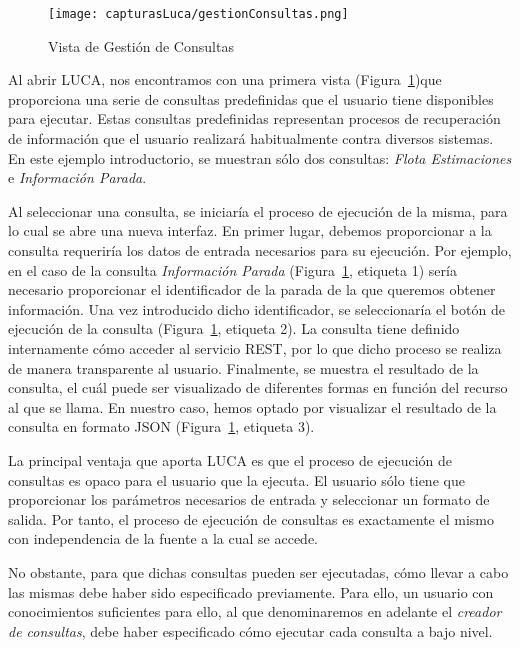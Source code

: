 \begin{figure}[!tb]
    \centering
 	\texttt{[image: capturasLuca/gestionConsultas.png]}
	\caption{Vista de Gestión de Consultas}
    \label{fig:gestionConsulta}
\end{figure}

Al abrir LUCA, nos encontramos con una primera vista (Figura~\ref{fig:gestionConsulta})que proporciona una serie de consultas predefinidas que el usuario tiene disponibles para ejecutar. Estas consultas predefinidas representan procesos de recuperación de información que el usuario realizará habitualmente contra diversos sistemas. En este ejemplo introductorio, se muestran sólo dos consultas: \emph{Flota Estimaciones} e \emph{Información Parada}.


Al seleccionar una consulta, se iniciaría el proceso de ejecución de la misma, para lo cual se abre una nueva interfaz. En primer lugar, debemos proporcionar a la consulta requeriría los datos de entrada necesarios para su ejecución. Por ejemplo, en el caso de la consulta \emph{Información Parada} (Figura~\ref{fig:gestionConsulta}, etiqueta 1) sería necesario proporcionar el identificador de la parada de la que queremos obtener información. Una vez introducido dicho identificador, se seleccionaría el botón de ejecución de la consulta (Figura~\ref{fig:gestionConsulta}, etiqueta 2). La consulta tiene definido internamente cómo acceder al servicio REST, por lo que dicho proceso se realiza de manera transparente al usuario. Finalmente, se muestra el resultado de la consulta, el cuál puede ser visualizado de diferentes formas en función del recurso al que se llama. En nuestro caso, hemos optado por visualizar el resultado de la consulta en formato JSON (Figura~\ref{fig:gestionConsulta}, etiqueta 3).

La principal ventaja que aporta LUCA es que el proceso de ejecución de consultas es opaco para el usuario que la ejecuta. El usuario sólo tiene que proporcionar los parámetros necesarios de entrada y seleccionar un formato de salida. Por tanto, el proceso de ejecución de consultas es exactamente el mismo con independencia de la fuente a la cual se accede.

No obstante, para que dichas consultas pueden ser ejecutadas, cómo llevar a cabo las mismas debe haber sido especificado previamente. Para ello, un usuario con conocimientos suficientes para ello, al que denominaremos en adelante el \emph{creador de consultas}, debe haber especificado cómo ejecutar cada consulta a bajo nivel.

